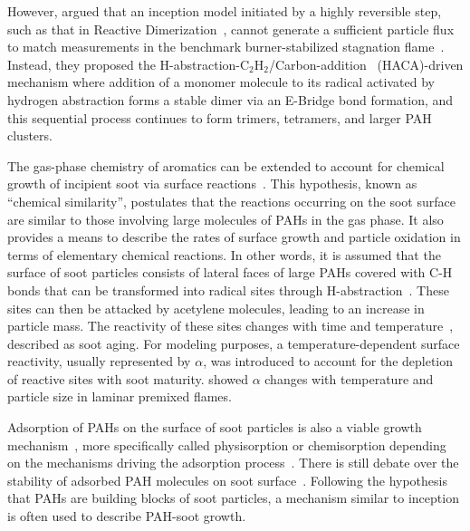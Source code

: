 However, \citet{frenklach2020mechanism} argued that an inception model initiated by a highly reversible step, such as that in Reactive Dimerization~\citep{kholghy2018reactive}, cannot generate a sufficient particle flux to match measurements in the benchmark burner-stabilized stagnation flame~\citep{abid2009quantitative}. Instead, they proposed the H-abstraction-$\mathrm{C_2H_2}$/Carbon-addition~\citep{frenklach1991detailed, appel2000kinetic} (HACA)-driven mechanism where addition of a monomer molecule to its radical activated by hydrogen abstraction forms a stable dimer via an E-Bridge bond formation, and this sequential process continues to form trimers, tetramers, and larger PAH clusters. %

The gas-phase chemistry of aromatics can be extended to account for chemical growth of incipient soot via surface reactions~\citep{frenklach2002reaction}. This hypothesis, known as “chemical similarity”, postulates that the reactions occurring on the soot surface are similar to those involving large molecules of PAHs in the gas phase. It also provides a means to describe the rates of surface growth and particle oxidation in
terms of elementary chemical reactions. In other words, it is assumed that the surface of soot particles consists of lateral faces of large PAHs covered with C-H bonds that can be transformed into radical sites through H-abstraction~\citep{frenklach1991detailed, appel2000kinetic}. These sites can then be attacked by acetylene molecules, leading to an increase in particle mass. The reactivity of these sites changes with time and temperature~\citep{woods1991soot, dasch1985decay}, described as soot aging. For modeling purposes, a temperature-dependent surface reactivity, usually represented by $\alpha$, was introduced to account for the depletion of reactive sites with soot maturity. \citet{appel2000kinetic} showed $\alpha$ changes with temperature and particle size in laminar premixed flames.


Adsorption of PAHs on the surface of soot particles is also a viable growth mechanism~\citep{frenklach1991detailed}, more specifically called physisorption or chemisorption depending on the mechanisms driving the adsorption process~\citep{michelsen2020review}. There is still debate over the stability of adsorbed PAH molecules on soot surface~\citep{obolensky2007interplay}. Following the hypothesis that PAHs are building blocks of soot particles, a mechanism similar to inception is often used to describe PAH-soot growth.



